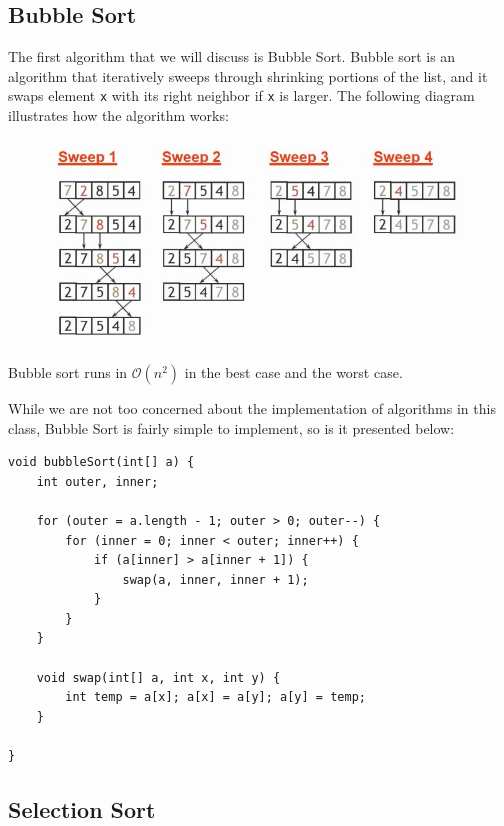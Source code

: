 \newpage

\subsection{Bubble Sort}

The first algorithm that we will discuss is Bubble Sort. Bubble sort is an algorithm that iteratively sweeps through shrinking portions of the list, and it swaps element \verb!x! with its right neighbor if \verb!x! is larger. The following diagram illustrates how the algorithm works:

\begin{figure}[h]
\includegraphics[width=\textwidth]{bsort.jpg}
\centering
\end{figure}


Bubble sort runs in $\mathcal{O}(n^2)$ in the best case and the worst case. 

While we are not too concerned about the implementation of algorithms in this class, Bubble Sort is fairly simple to implement, so is it presented below:

\begin{lstlisting}
void bubbleSort(int[] a) {
    int outer, inner;
    
    for (outer = a.length - 1; outer > 0; outer--) {
        for (inner = 0; inner < outer; inner++) {
            if (a[inner] > a[inner + 1]) {
                swap(a, inner, inner + 1);
            }
        }
    }

    void swap(int[] a, int x, int y) {
        int temp = a[x]; a[x] = a[y]; a[y] = temp;
    }

}
\end{lstlisting}

\subsection{Selection Sort}

